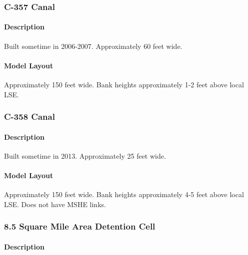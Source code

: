 
\subsubsection{C-357 Canal}

\paragraph{Description}
Built sometime in 2006-2007.
Approximately 60 feet wide.

\paragraph{Model Layout}
Approximately 150 feet wide.  Bank heights approximately 1-2 feet above local LSE.


\subsubsection{C-358 Canal}

\paragraph{Description}
Built sometime in 2013.
Approximately 25 feet wide.

\paragraph{Model Layout}
Approximately 150 feet wide. Bank heights approximately 4-5 feet above local LSE. Does not have MSHE links.


\subsubsection{8.5 Square Mile Area Detention Cell}

\paragraph{Description}

